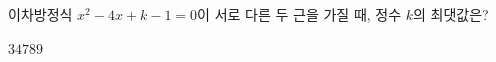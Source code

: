 이차방정식 $x^2-4x+k-1=0$이 서로 다른 두 근을 가질 때, 정수 $k$의 최댓값은?
\begin{choices32}{$3$}{$4$}{$7$}{$8$}{$9$}\end{choices32}
